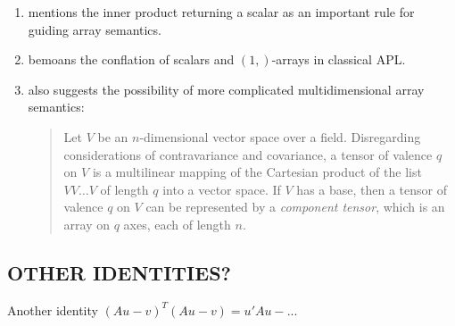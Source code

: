 \begin{enumerate}
\item \cite{More1973} mentions the inner product returning a scalar as an
	important rule for guiding array semantics.

\item \cite{Haegi1976} bemoans the conflation of scalars and $(1,)$-arrays in
	classical APL.

\item \cite[p. 153]{More1973} also suggests the possibility of more complicated
	multidimensional array semantics:

\begin{quote}
Let $V$ be an $n$-dimensional vector space over a field. Disregarding
considerations of contravariance and covariance, a tensor of valence $q$ on $V$
is a multilinear mapping of the Cartesian product of the list $V V \dots V$ of
length $q$ into a vector space. If $V$ has a base, then a tensor of valence $q$
on $V$ can be represented by a \textit{component tensor}, which is an array on
$q$ axes, each of length $n$.
\end{quote}

\end{enumerate}


\subsection{OTHER IDENTITIES?}
Another identity $(Au - v)^T(Au - v) = u'Au -...$
